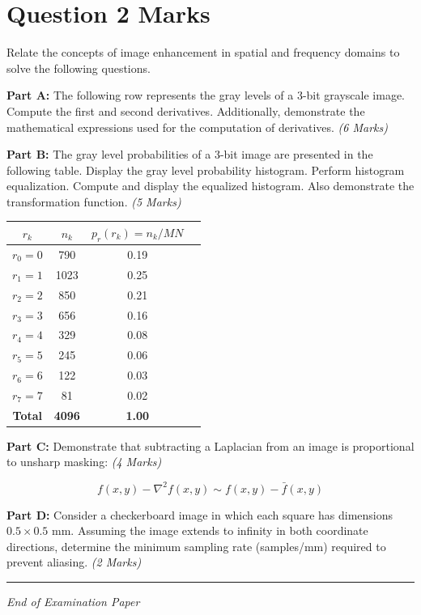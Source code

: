 \documentclass[12pt,a4paper]{article}
\begin{document}
\vspace{1.0cm}
\section*{Question 2   Marks}

Relate the concepts of image enhancement in spatial and frequency domains to solve the following questions.

\textbf{Part A:} The following row represents the gray levels of a 3-bit grayscale image. Compute the first and second derivatives. Additionally, demonstrate the mathematical expressions used for the computation of derivatives. \quad \textit{(6 Marks)}

\begin{center}
\end{center}

\textbf{Part B:} The gray level probabilities of a 3-bit image are presented in the following table. Display the gray level probability histogram. Perform histogram equalization. Compute and display the equalized histogram. Also demonstrate the transformation function. \quad \textit{(5 Marks)}

\begin{center}
\begin{tabular}{|c|c|c|c|}
\hline
$r_k$ & $n_k$ & $p_r(r_k) = n_k/MN$ & \\
\hline
$r_0 = 0$ & 790 & 0.19 & \\
$r_1 = 1$ & 1023 & 0.25 & \\
$r_2 = 2$ & 850 & 0.21 & \\
$r_3 = 3$ & 656 & 0.16 & \\
$r_4 = 4$ & 329 & 0.08 & \\
$r_5 = 5$ & 245 & 0.06 & \\
$r_6 = 6$ & 122 & 0.03 & \\
$r_7 = 7$ & 81 & 0.02 & \\
\hline
\textbf{Total} & \textbf{4096} & \textbf{1.00} & \\
\hline
\end{tabular}
\end{center}

\textbf{Part C:} Demonstrate that subtracting a Laplacian from an image is proportional to unsharp masking: \quad \textit{(4 Marks)}

\begin{equation*}
f(x, y) - \nabla^2 f(x, y) \sim f(x, y) - \bar{f}(x, y)
\end{equation*}

\textbf{Part D:} Consider a checkerboard image in which each square has dimensions $0.5 \times 0.5$ mm. Assuming the image extends to infinity in both coordinate directions, determine the minimum sampling rate (samples/mm) required to prevent aliasing. \quad \textit{(2 Marks)}

\vspace{2.0cm}
\noindent\rule{\textwidth}{0.5pt}
\begin{center}
\textit{End of Examination Paper}
\end{center}
\end{document}
